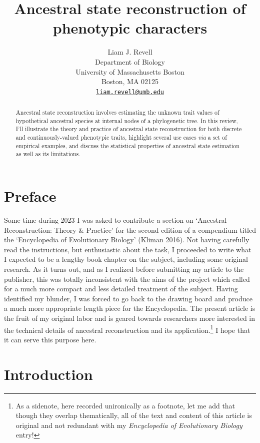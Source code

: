 \documentclass{article}
\title{Ancestral state reconstruction of phenotypic characters}
\author{
    Liam J. Revell
   \\
    Department of Biology \\
    University of Massachusetts Boston \\
  Boston, MA 02125 \\
  \texttt{\href{mailto:liam.revell@umb.edu}{\nolinkurl{liam.revell@umb.edu}}} \\
  }
\begin{document}
\maketitle


\begin{abstract}
Ancestral state reconstruction involves estimating the unknown trait values of hypothetical ancestral species at internal nodes of a phylogenetic tree. In this review, I'll illustrate the theory and practice of ancestral state reconstruction for both discrete and continuously-valued phenotypic traits, highlight several use cases \emph{via} a set of empirical examples, and discuss the statistical properties of ancestral state estimation as well as its limitations.
\end{abstract}


\section{Preface}\label{preface}

Some time during 2023 I was asked to contribute a section on `Ancestral Reconstruction: Theory \& Practice' for the second edition of a compendium titled the `Encyclopedia of Evolutionary Biology' (Kliman 2016). Not having carefully read the instructions, but enthusiastic about the task, I proceeded to write what I expected to be a lengthy book chapter on the subject, including some original research. As it turns out, and as I realized before submitting my article to the publisher, this was totally inconsistent with the aims of the project which called for a much more compact and less detailed treatment of the subject. Having identified my blunder, I was forced to go back to the drawing board and produce a much more appropriate length piece for the Encyclopedia. The present article is the fruit of my original labor and is geared towards researchers more interested in the technical details of ancestral reconstruction and its application.\footnote{As a sidenote, here recorded unironically as a footnote, let me add that though they overlap thematically, all of the text and content of this article is original and not redundant with my \emph{Encyclopedia of Evolutionary Biology} entry!} I hope that it can serve this purpose here.

\section{Introduction}\label{introduction}
\end{document}

